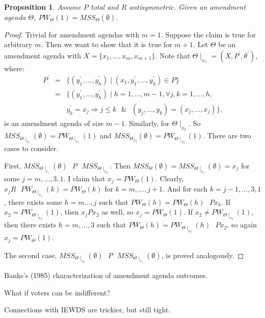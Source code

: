 \documentclass[12pt]{article}
\newtheorem{propo}{Proposition}[section]
\newcommand{\n}{\noindent}
\newcommand{\s}{\vspace{5mm}}
\begin{document}
\s
\n\begin{propo}  Assume $P$ total and $R$ antisymmetric.  Given an amendment agenda $\Theta$, $PW_{\Theta}(1)=MSS_{\Theta}(\emptyset)$.  
\end{propo}
\begin{proof}  Trivial for amendment agendas with $m=1$.  Suppose the claim is true for arbitrary $m$.  Then we want to show that it is true for $m+1$.  Let $\Theta$ be an amendment agenda with $X=\{x_1,\hdots,x_m,x_{m+1}\}$.  Note that $\Theta\mid_{x_1}=(X,P^{\prime},\theta^{\prime})$, where:
\begin{eqnarray*}
P^{\prime}&=&\{(y_1^{\prime},\hdots,y_h^{\prime})\mid (x_1,y_1^{\prime},\hdots,y_h^{\prime})\in P\}\\
&=&\{(y_1^{\prime},\hdots,y_h^{\prime})\mid h=1,\hdots,m-1,\forall j,k=1,\hdots,h,\\
&& y_k^{\prime}=x_j\Rightarrow j\leq k\mbox{ }\&\mbox{ }(y_j,\hdots,y_k)=(x_j,\hdots,x_j)\},
\end{eqnarray*} is an amendment agenda of size $m-1$.  Similarly, for $\Theta\mid_{x_2}$.  So $MSS_{\Theta\mid_{x_1}}(\emptyset)=PW_{\Theta\mid_{x_1}}(1)$ and $MSS_{\Theta_{x_2}}(\emptyset)=PW_{\Theta\mid_{x_2}}(1)$.  There are two cases to consider.  

First, $MSS_{\Theta\mid_{x_1}}(\emptyset)\mbox{ }P\mbox{ }MSS_{\Theta\mid_{x_2}}$.  Then $MSS_{\Theta}(\emptyset)=MSS_{\Theta\mid_{x_1}}(\emptyset)=x_j$ for some $j=m,\hdots,3,1$.  I claim that $x_j=PW_{\Theta}(1)$.  Clearly, $x_jR\mbox{ }PW_{\Theta\mid_{x_1}}(k)=PW_{\Theta}(k)$ for $k=m,\hdots,j+1$.  And for each $k=j-1,\hdots,3,1$, there exists some $h=m\hdots,j$ such that $PW_{\Theta}(h)=PW_{\Theta}(h)\mbox{ }Px_k$.  If $x_2=PW_{\Theta\mid_{x_2}}(1)$, then $x_jPx_2$ as well, so $x_j=PW_{\Theta}(1)$.  If $x_2\neq PW_{\Theta\mid_{x_2}}(1)$, then there exists $h=m,\hdots,3$ such that $PW_{\Theta}(h)=PW_{\Theta\mid_{x_2}}(h)\mbox{ }Px_2$, so again $x_j=PW_{\Theta}(1)$.

The second case, $MSS_{\Theta\mid_{x_2}}(\emptyset)\mbox{ }P\mbox{ }MSS_{\Theta\mid_{x_1}}(\emptyset)$, is proved analogously.  
\end{proof}

\s
\n Banks's (1985) characterization of amendment agenda outcomes.

\s
\n What if voters can be indifferent?

\s
\n Connections with IEWDS are trickier, but still tight.  
\end{document}
